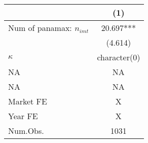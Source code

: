 
\begin{tabular}[t]{lc}
\toprule
  & (1)\\
\midrule
Num of panamax: $n_{imt}$ & 20.697***\\
 & (4.614)\\
\midrule
$\kappa$ & character(0)\\
NA & \vphantom{1} NA\\
NA & NA\\
Market FE & X\\
Year FE & X\\
Num.Obs. & 1031\\
\bottomrule
\end{tabular}
